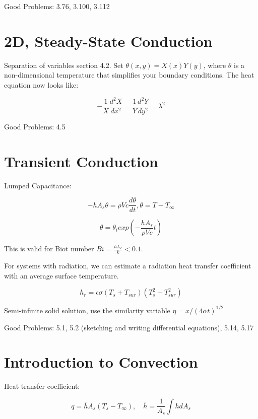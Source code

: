 \documentclass[paper=letter, fontsize=11pt]{scrartcl}
\numberwithin{equation}{section}        %
\numberwithin{figure}{section}          %
\numberwithin{table}{section}               %
\begin{document}
\bigskip Good Problems: 3.76, 3.100, 3.112


\section{2D, Steady-State Conduction}

Separation of variables section 4.2. Set $\theta(x,y) = X(x)Y(y)$, where $\theta$ is a non-dimensional temperature that simplifies your boundary conditions. The heat equation now looks like:

\begin{equation}
-\frac{1}{X}\frac{d^2X}{dx^2} = \frac{1}{Y}\frac{d^2Y}{dy^2} = \lambda^2
\end{equation}

\bigskip Good Problems: 4.5


\section{Transient Conduction}

Lumped Capacitance:

\begin{equation}
-hA_s\theta = \rho Vc\frac{d \theta}{dt}, \theta = T-T_\infty
\end{equation}

\begin{equation}
\theta = \theta_i exp\left(-\frac{hA_s}{\rho Vc}t\right)
\end{equation}

This is valid for Biot number $Bi = \frac{hL_c}{k} < 0.1$.

For systems with radiation, we can estimate a radiation heat transfer coefficient with an average surface temperature.

\begin{equation}
h_r = \epsilon\sigma(T_s + T_{sur})(T_s^2 + T_{sur}^2)
\end{equation}

Semi-infinite solid solution, use the similarity variable $\eta = x/(4\alpha t)^{1/2}$

\bigskip Good Problems: 5.1, 5.2 (sketching and writing differential equations), 5.14, 5.17


\section{Introduction to Convection}
Heat transfer coefficient:

\begin{equation}
q = \bar h A_s(T_s-T_\infty), \quad \bar h = \frac{1}{A_s}\int hdA_s
\end{equation}
\end{document}
